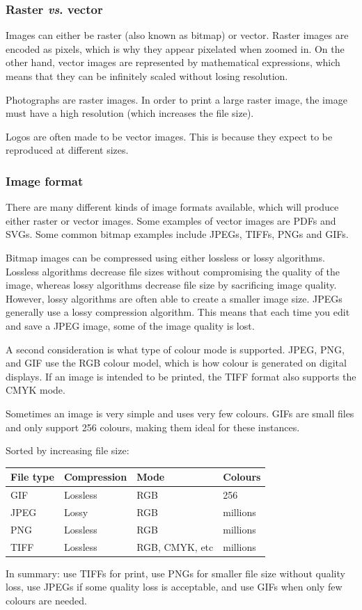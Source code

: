 \documentclass[letterpaper]{report}\usepackage[]{graphicx}\usepackage[]{color}
\begin{document}
\subsubsection{Raster \textit{vs}. vector}
Images can either be raster (also known as bitmap) or vector. Raster images are encoded as pixels, which is why they appear pixelated when zoomed in. On the other hand, vector images are represented by mathematical expressions, which means that they can be infinitely scaled without losing resolution. 

Photographs are raster images. In order to print a large raster image, the image must have a high resolution (which increases the file size). 

Logos are often made to be vector images. This is because they expect to be reproduced at different sizes. 

\subsubsection{Image format}
There are many different kinds of image formats available, which will produce either raster or vector images. Some examples of vector images are PDFs and SVGs. Some common bitmap examples include JPEGs, TIFFs, PNGs and GIFs. 

Bitmap images can be compressed using either lossless or lossy algorithms. Lossless algorithms decrease file sizes without compromising the quality of the image, whereas lossy algorithms decrease file size by sacrificing image quality. However, lossy algorithms are often able to create a smaller image size. JPEGs generally use a lossy compression algorithm. This means that each time you edit and save a JPEG image, some of the image quality is lost. 

A second consideration is what type of colour mode is supported. JPEG, PNG, and GIF use the RGB colour model, which is how colour is generated on digital displays. If an image is intended to be printed, the TIFF format also supports the CMYK mode.

Sometimes an image is very simple and uses very few colours. GIFs are small files and only support 256 colours, making them ideal for these instances.

Sorted by increasing file size:
\begin{center}
\begin{tabular}{l l l l }
\hline
File type & Compression & Mode & Colours \\
\hline
GIF & Lossless & RGB & 256 \\
JPEG &  Lossy & RGB & millions\\
PNG &Lossless & RGB &  millions \\
TIFF & Lossless & RGB, CMYK, etc & millions \\
\end{tabular}
\end{center}
\bigskip
In summary: use TIFFs for print, use PNGs for smaller file size without quality loss, use JPEGs if some quality loss is acceptable, and use GIFs when only few colours are needed.
\end{document}
